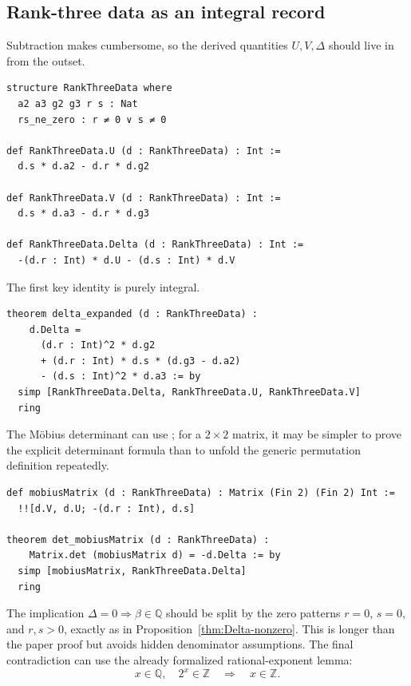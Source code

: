 \documentclass[11pt,oneside]{article}
\theoremstyle{research}
\theoremstyle{definition}
\newcommand{\Q}{\mathbb Q}
\newcommand{\Z}{\mathbb Z}
\newcommand{\code}[1]{\texttt{\detokenize{#1}}}
\begin{document}
\subsection{Rank-three data as an integral record}

Subtraction makes \code{Nat} cumbersome, so the derived quantities $U,V,\Delta$
should live in \code{Int} from the outset.

\begin{lstlisting}[language={},caption={Proposed rank-three parameter record.}]
structure RankThreeData where
  a2 a3 g2 g3 r s : Nat
  rs_ne_zero : r ≠ 0 ∨ s ≠ 0

def RankThreeData.U (d : RankThreeData) : Int :=
  d.s * d.a2 - d.r * d.g2

def RankThreeData.V (d : RankThreeData) : Int :=
  d.s * d.a3 - d.r * d.g3

def RankThreeData.Delta (d : RankThreeData) : Int :=
  -(d.r : Int) * d.U - (d.s : Int) * d.V
\end{lstlisting}

The first key identity is purely integral.

\begin{lstlisting}[language={},caption={Expanded discriminant identity.}]
theorem delta_expanded (d : RankThreeData) :
    d.Delta =
      (d.r : Int)^2 * d.g2
      + (d.r : Int) * d.s * (d.g3 - d.a2)
      - (d.s : Int)^2 * d.a3 := by
  simp [RankThreeData.Delta, RankThreeData.U, RankThreeData.V]
  ring
\end{lstlisting}

The M\"obius determinant can use \code{Matrix (Fin 2) (Fin 2) Int}; for a
$2\times2$ matrix, it may be simpler to prove the explicit determinant formula
than to unfold the generic permutation definition repeatedly.

\begin{lstlisting}[language={},caption={M\"obius determinant identity.}]
def mobiusMatrix (d : RankThreeData) : Matrix (Fin 2) (Fin 2) Int :=
  !![d.V, d.U; -(d.r : Int), d.s]

theorem det_mobiusMatrix (d : RankThreeData) :
    Matrix.det (mobiusMatrix d) = -d.Delta := by
  simp [mobiusMatrix, RankThreeData.Delta]
  ring
\end{lstlisting}

The implication $\Delta=0\Rightarrow\beta\in\Q$ should be split by the zero
patterns $r=0$, $s=0$, and $r,s>0$, exactly as in
Proposition~\ref{thm:Delta-nonzero}.  This is longer than the paper proof but
avoids hidden denominator assumptions.  The final contradiction can use the
already formalized rational-exponent lemma:
\[
 x\in\Q,\quad 2^x\in\Z \quad\Longrightarrow\quad x\in\Z.
\]
\end{document}
